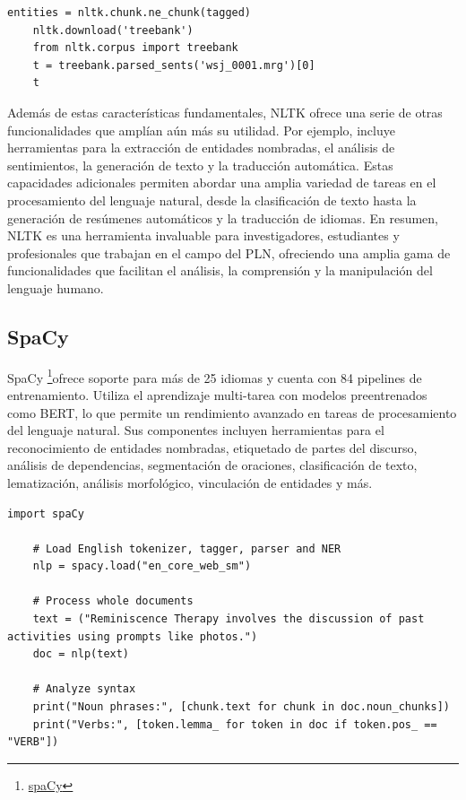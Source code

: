 \begin{lstlisting}[style=SpyderStyle, caption={Análisis sintáctico y lematización con nltk}, captionpos=b, label={lst:python},breaklines = true]
	entities = nltk.chunk.ne_chunk(tagged)
	nltk.download('treebank')
	from nltk.corpus import treebank
	t = treebank.parsed_sents('wsj_0001.mrg')[0]
	t
\end{lstlisting}


Además de estas características fundamentales, NLTK ofrece una serie de otras funcionalidades que amplían aún más su utilidad. Por ejemplo, incluye herramientas para la extracción de entidades nombradas, el análisis de sentimientos, la generación de texto y la traducción automática. Estas capacidades adicionales permiten abordar una amplia variedad de tareas en el procesamiento del lenguaje natural, desde la clasificación de texto hasta la generación de resúmenes automáticos y la traducción de idiomas. En resumen, NLTK es una herramienta invaluable para investigadores, estudiantes y profesionales que trabajan en el campo del PLN, ofreciendo una amplia gama de funcionalidades que facilitan el análisis, la comprensión y la manipulación del lenguaje humano.


\subsection{SpaCy}
\label{sec:Spacy}
SpaCy \footnote{\href{https://spacy.io/}{spaCy}}ofrece soporte para más de 25 idiomas y cuenta con 84 pipelines de entrenamiento. Utiliza el aprendizaje multi-tarea con modelos preentrenados como BERT, lo que permite un rendimiento avanzado en tareas de procesamiento del lenguaje natural. Sus componentes incluyen herramientas para el reconocimiento de entidades nombradas, etiquetado de partes del discurso, análisis de dependencias, segmentación de oraciones, clasificación de texto, lematización, análisis morfológico, vinculación de entidades y más.

\begin{lstlisting}[style=SpyderStyle, caption={Ejemplo de tokenización usando spaCy}, captionpos=b, label={lst:python},breaklines = true]
	import spaCy
	
	# Load English tokenizer, tagger, parser and NER
	nlp = spacy.load("en_core_web_sm")
	
	# Process whole documents
	text = ("Reminiscence Therapy involves the discussion of past activities using prompts like photos.")
	doc = nlp(text)
	
	# Analyze syntax
	print("Noun phrases:", [chunk.text for chunk in doc.noun_chunks])
	print("Verbs:", [token.lemma_ for token in doc if token.pos_ == "VERB"])
\end{lstlisting}

